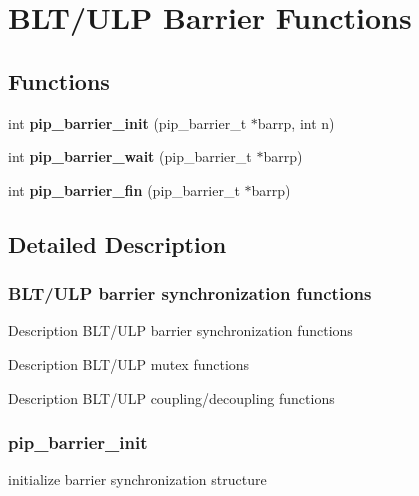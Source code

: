 \hypertarget{group__ulp-4-barrier}{\section{B\-L\-T/\-U\-L\-P Barrier Functions}
\label{group__ulp-4-barrier}
}
\subsection*{Functions}
\begin{DoxyCompactItemize}
\item 
\hypertarget{group__ulp-4-barrier_ga84022f9c64f431e7d513342aeed0b61e}{int {\bfseries pip\-\_\-barrier\-\_\-init} (pip\-\_\-barrier\-\_\-t $\ast$barrp, int n)}\label{group__ulp-4-barrier_ga84022f9c64f431e7d513342aeed0b61e}

\item 
\hypertarget{group__ulp-4-barrier_gaca103c9732a8e28ee8faf79ef4a69e4f}{int {\bfseries pip\-\_\-barrier\-\_\-wait} (pip\-\_\-barrier\-\_\-t $\ast$barrp)}\label{group__ulp-4-barrier_gaca103c9732a8e28ee8faf79ef4a69e4f}

\item 
\hypertarget{group__ulp-4-barrier_ga70dab15271b84fe05d7088a6cf8bf784}{int {\bfseries pip\-\_\-barrier\-\_\-fin} (pip\-\_\-barrier\-\_\-t $\ast$barrp)}\label{group__ulp-4-barrier_ga70dab15271b84fe05d7088a6cf8bf784}

\end{DoxyCompactItemize}


\subsection{Detailed Description}
\hypertarget{ulp-barrier}{}\subsubsection{B\-L\-T/\-U\-L\-P barrier synchronization functions}\label{ulp-barrier}
\begin{DoxyParagraph}{Description}
B\-L\-T/\-U\-L\-P barrier synchronization functions
\end{DoxyParagraph}
\begin{DoxyParagraph}{Description}
B\-L\-T/\-U\-L\-P mutex functions
\end{DoxyParagraph}
\begin{DoxyParagraph}{Description}
B\-L\-T/\-U\-L\-P coupling/decoupling functions 
\end{DoxyParagraph}
\hypertarget{pip_barrier_init}{}\subsubsection{pip\-\_\-barrier\-\_\-init}\label{pip_barrier_init}
initialize barrier synchronization structure


